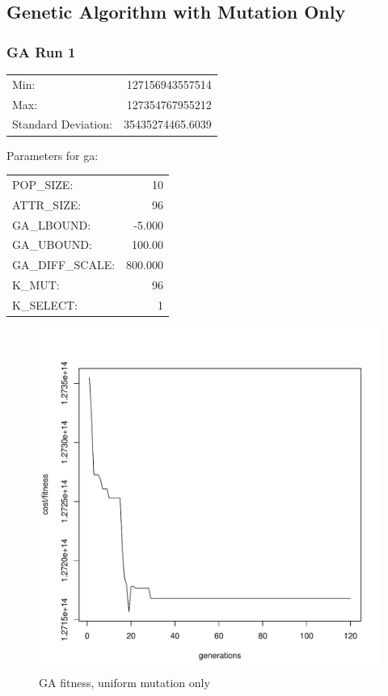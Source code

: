\pagebreak

\subsection{Genetic Algorithm with Mutation Only}

\subsubsection{GA Run 1}
\begin{tabular}{lr}
	Min: 			& 127156943557514  \\
	Max:			& 127354767955212  \\
	Standard Deviation:	& 35435274465.6039 \\
\end{tabular}

Parameters for ga:\\
\begin{tabular}{lr}
	POP\_SIZE:	& 10 \\
	ATTR\_SIZE:	& 96 \\
	GA\_LBOUND:	& -5.000 \\
	GA\_UBOUND:	& 100.00 \\
	GA\_DIFF\_SCALE: & 800.000 \\
	K\_MUT:		& 96 \\
	K\_SELECT:	& 1 \\
\end{tabular}

\begin{figure}[!h]
	\begin{center}
		\includegraphics[width=120mm]{output/ga01/graph.pdf}
               	\caption{GA fitness, uniform mutation only}
                \label{ga01_exc}
        \end{center}
\end{figure}

